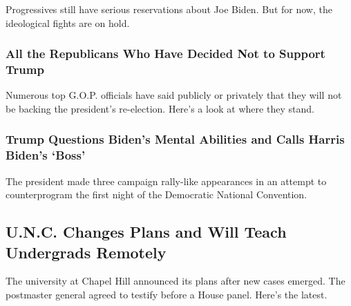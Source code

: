 \href{https://www.nytimes3xbfgragh.onion/2020/08/17/us/politics/convention-democratic-night-1.html}{}

Progressives still have serious reservations about Joe Biden. But for
now, the ideological fights are on hold.

\href{https://www.nytimes3xbfgragh.onion/article/republicans-voting-for-biden-not-trump.html}{}

\hypertarget{all-the-republicans-who-have-decided-not-to-support-trump}{%
\subsubsection{All the Republicans Who Have Decided Not to Support
Trump}\label{all-the-republicans-who-have-decided-not-to-support-trump}}

\href{https://www.nytimes3xbfgragh.onion/article/republicans-voting-for-biden-not-trump.html}{}

Numerous top G.O.P. officials have said publicly or privately that they
will not be backing the president's re-election. Here's a look at where
they stand.

\href{https://www.nytimes3xbfgragh.onion/2020/08/17/us/politics/trump-campaign-biden-harris.html}{}

\hypertarget{trump-questions-bidens-mental-abilities-and-calls-harris-bidens-boss}{%
\subsubsection{Trump Questions Biden's Mental Abilities and Calls Harris
Biden's
`Boss'}\label{trump-questions-bidens-mental-abilities-and-calls-harris-bidens-boss}}

\href{https://www.nytimes3xbfgragh.onion/2020/08/17/us/politics/trump-campaign-biden-harris.html}{}

The president made three campaign rally-like appearances in an attempt
to counterprogram the first night of the Democratic National Convention.

\href{/2020/08/17/world/coronavirus-covid.html}{}

\hypertarget{unc-changes-plans-and-will-teach-undergrads-remotely}{%
\subsection{U.N.C. Changes Plans and Will Teach Undergrads
Remotely}\label{unc-changes-plans-and-will-teach-undergrads-remotely}}

The university at Chapel Hill announced its plans after new cases
emerged. The postmaster general agreed to testify before a House panel.
Here's the latest.


